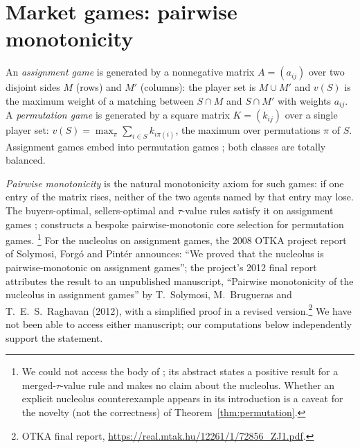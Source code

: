 \documentclass[11pt]{article}
\begin{document}
\section{Market games: pairwise monotonicity}\label{sec:markets}

An \emph{assignment game} \citep{NunezRafels2002} is generated by a
nonnegative matrix $A=(a_{ij})$ over two disjoint sides $M$ (rows) and $M'$
(columns): the player set is $M\cup M'$ and $v(S)$ is the maximum weight of
a matching between $S\cap M$ and $S\cap M'$ with weights $a_{ij}$. A
\emph{permutation game} \citep{TijsEtAl84} is generated by a square matrix
$K=(k_{ij})$ over a single player set:
$v(S)=\max_\pi\sum_{i\in S}k_{i\pi(i)}$, the maximum over permutations
$\pi$ of $S$. Assignment games embed into permutation games
\citep{CurielTijs86}; both classes are totally balanced.

\emph{Pairwise monotonicity} \citep{NunezRafels2002} is
the natural monotonicity axiom for such games: if one entry of the matrix
rises, neither of the two agents named by that entry may lose. The
buyers-optimal, sellers-optimal and $\tau$-value rules satisfy it on
assignment games \citep{NunezRafels2002,vdBNunezRobles2021}; \citet{Miquel2009} constructs a bespoke pairwise-monotonic core selection for
permutation games.%
\footnote{We could not access the body of \citet{Miquel2009}; its abstract
states a positive result for a merged-$\tau$-value rule and makes no claim
about the nucleolus. Whether an explicit nucleolus counterexample appears in
its introduction is a caveat for the novelty (not the correctness) of
Theorem~\ref{thm:permutation}.}
For the nucleolus on assignment games, the 2008 OTKA project report of
Solymosi, Forg\'o and Pint\'er \citep{SFP2008} announces: ``We proved that
the nucleolus is pairwise-monotonic on assignment games''; the project's
2012 final report attributes the result to an unpublished manuscript,
``Pairwise monotonicity of the nucleolus in assignment games'' by
T.~Solymosi, M.~Brugueras and T.~E.~S.~Raghavan (2012), with a simplified
proof in a revised version.\footnote{OTKA final report,
\url{https://real.mtak.hu/12261/1/72856_ZJ1.pdf}.} We have not been able to
access either manuscript; our computations below independently support the
statement.
\end{document}
